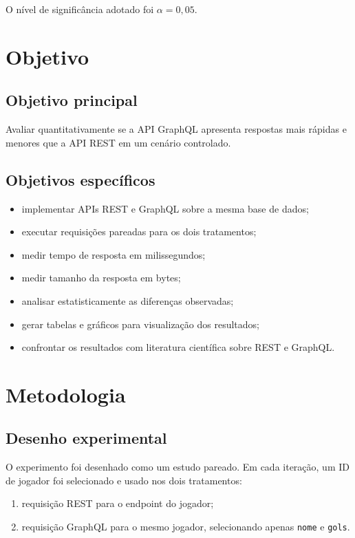 \documentclass[12pt,a4paper]{article}
\begin{document}
O nível de significância adotado foi $\alpha = 0{,}05$.

\section{Objetivo}

\subsection{Objetivo principal}

Avaliar quantitativamente se a API GraphQL apresenta respostas mais rápidas e menores que a API REST em um cenário controlado.

\subsection{Objetivos específicos}

\begin{itemize}
  \item implementar APIs REST e GraphQL sobre a mesma base de dados;
  \item executar requisições pareadas para os dois tratamentos;
  \item medir tempo de resposta em milissegundos;
  \item medir tamanho da resposta em bytes;
  \item analisar estatisticamente as diferenças observadas;
  \item gerar tabelas e gráficos para visualização dos resultados;
  \item confrontar os resultados com literatura científica sobre REST e GraphQL.
\end{itemize}

\section{Metodologia}

\subsection{Desenho experimental}

O experimento foi desenhado como um estudo pareado. Em cada iteração, um ID de jogador foi selecionado e usado nos dois tratamentos:

\begin{enumerate}
  \item requisição REST para o endpoint do jogador;
  \item requisição GraphQL para o mesmo jogador, selecionando apenas \texttt{nome} e \texttt{gols}.
\end{enumerate}
\end{document}
